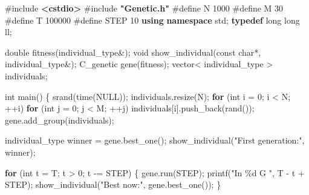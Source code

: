 \documentclass[
]{article}
\newenvironment{Shaded}{}{}
\newcommand{\AttributeTok}[1]{\textcolor[rgb]{0.49,0.56,0.16}{#1}}
\newcommand{\ControlFlowTok}[1]{\textcolor[rgb]{0.00,0.44,0.13}{\textbf{#1}}}
\newcommand{\DataTypeTok}[1]{\textcolor[rgb]{0.56,0.13,0.00}{#1}}
\newcommand{\DecValTok}[1]{\textcolor[rgb]{0.25,0.63,0.44}{#1}}
\newcommand{\ImportTok}[1]{\textcolor[rgb]{0.00,0.50,0.00}{\textbf{#1}}}
\newcommand{\KeywordTok}[1]{\textcolor[rgb]{0.00,0.44,0.13}{\textbf{#1}}}
\newcommand{\NormalTok}[1]{#1}
\newcommand{\OperatorTok}[1]{\textcolor[rgb]{0.40,0.40,0.40}{#1}}
\newcommand{\PreprocessorTok}[1]{\textcolor[rgb]{0.74,0.48,0.00}{#1}}
\newcommand{\SpecialCharTok}[1]{\textcolor[rgb]{0.25,0.44,0.63}{#1}}
\newcommand{\StringTok}[1]{\textcolor[rgb]{0.25,0.44,0.63}{#1}}
\begin{document}
\begin{Shaded}
\begin{Highlighting}[]
\PreprocessorTok{\#include }\ImportTok{\textless{}cstdio\textgreater{}}
\PreprocessorTok{\#include }\ImportTok{"Genetic.h"}
\PreprocessorTok{\#define N }\DecValTok{1000}
\PreprocessorTok{\#define M }\DecValTok{30}
\PreprocessorTok{\#define T }\DecValTok{100000}
\PreprocessorTok{\#define STEP }\DecValTok{10}
\KeywordTok{using} \KeywordTok{namespace}\NormalTok{ std}\OperatorTok{;}
\KeywordTok{typedef} \DataTypeTok{long} \DataTypeTok{long}\NormalTok{ ll}\OperatorTok{;}

\DataTypeTok{double}\NormalTok{ fitness}\OperatorTok{(}\DataTypeTok{individual\_type}\OperatorTok{\&);}
\DataTypeTok{void}\NormalTok{ show\_individual}\OperatorTok{(}\AttributeTok{const} \DataTypeTok{char}\OperatorTok{*,} \DataTypeTok{individual\_type}\OperatorTok{\&);}
\NormalTok{C\_genetic gene}\OperatorTok{(}\NormalTok{fitness}\OperatorTok{);}
\NormalTok{vector}\OperatorTok{\textless{}} \DataTypeTok{individual\_type} \OperatorTok{\textgreater{}}\NormalTok{ individuals}\OperatorTok{;}

\DataTypeTok{int}\NormalTok{ main}\OperatorTok{()} \OperatorTok{\{}
\NormalTok{	srand}\OperatorTok{(}\NormalTok{time}\OperatorTok{(}\NormalTok{NULL}\OperatorTok{));}
\NormalTok{	individuals}\OperatorTok{.}\NormalTok{resize}\OperatorTok{(}\NormalTok{N}\OperatorTok{);}
	\ControlFlowTok{for} \OperatorTok{(}\DataTypeTok{int}\NormalTok{ i }\OperatorTok{=} \DecValTok{0}\OperatorTok{;}\NormalTok{ i }\OperatorTok{\textless{}}\NormalTok{ N}\OperatorTok{;} \OperatorTok{++}\NormalTok{i}\OperatorTok{)}
		\ControlFlowTok{for} \OperatorTok{(}\DataTypeTok{int}\NormalTok{ j }\OperatorTok{=} \DecValTok{0}\OperatorTok{;}\NormalTok{ j }\OperatorTok{\textless{}}\NormalTok{ M}\OperatorTok{;} \OperatorTok{++}\NormalTok{j}\OperatorTok{)}
\NormalTok{			individuals}\OperatorTok{[}\NormalTok{i}\OperatorTok{].}\NormalTok{push\_back}\OperatorTok{(}\NormalTok{rand}\OperatorTok{());}
\NormalTok{	gene}\OperatorTok{.}\NormalTok{add\_group}\OperatorTok{(}\NormalTok{individuals}\OperatorTok{);}

	\DataTypeTok{individual\_type}\NormalTok{ winner }\OperatorTok{=}\NormalTok{ gene}\OperatorTok{.}\NormalTok{best\_one}\OperatorTok{();}
\NormalTok{	show\_individual}\OperatorTok{(}\StringTok{"First generation:"}\OperatorTok{,}\NormalTok{ winner}\OperatorTok{);}

	\ControlFlowTok{for} \OperatorTok{(}\DataTypeTok{int}\NormalTok{ t }\OperatorTok{=}\NormalTok{ T}\OperatorTok{;}\NormalTok{ t }\OperatorTok{\textgreater{}} \DecValTok{0}\OperatorTok{;}\NormalTok{ t }\OperatorTok{{-}=}\NormalTok{ STEP}\OperatorTok{)} \OperatorTok{\{}
\NormalTok{		gene}\OperatorTok{.}\NormalTok{run}\OperatorTok{(}\NormalTok{STEP}\OperatorTok{);}
\NormalTok{		printf}\OperatorTok{(}\StringTok{"In }\SpecialCharTok{\%d}\StringTok{ G "}\OperatorTok{,}\NormalTok{ T }\OperatorTok{{-}}\NormalTok{ t }\OperatorTok{+}\NormalTok{ STEP}\OperatorTok{);}
\NormalTok{		show\_individual}\OperatorTok{(}\StringTok{"Best now:"}\OperatorTok{,}\NormalTok{ gene}\OperatorTok{.}\NormalTok{best\_one}\OperatorTok{());}
	\OperatorTok{\}}


\end{Highlighting}
\end{Shaded}
\end{document}
